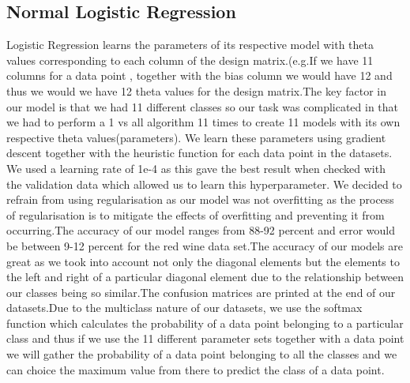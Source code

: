 \documentclass{article}
\begin{document}
\subsection{Normal Logistic Regression}
Logistic Regression learns the parameters of its respective model with theta values corresponding to each column of the design matrix.(e.g.If we have 11 columns for a data point , together with the bias column we would have 12 and thus we would we have 12 theta values for the design matrix.The key factor in our model is that we had 11 different classes so our task was complicated in that we had to perform a 1 vs all algorithm 11 times to create 11 models with its own respective theta values(parameters). We learn these parameters using gradient descent together with the heuristic function for each data point in the datasets. We used a learning rate of 1e-4 as this gave the best result when checked with the validation data which allowed us to learn this hyperparameter. We decided to refrain from using regularisation as our model was not overfitting as the process of regularisation is to mitigate the effects of overfitting and preventing it from occurring.The accuracy of our model ranges from 88-92 percent and error would be between 9-12 percent for the red wine data set.The accuracy of our models are great as we took into account not only the diagonal elements but the elements to the left and right of a particular diagonal element due to the relationship between our classes being so similar.The confusion matrices are printed at the end of our datasets.Due to the multiclass nature of our datasets, we use the softmax function which calculates the probability of a data point belonging to a particular class and thus if we use the 11 different parameter sets together with a data point we will gather the probability of a data point belonging to all the classes and we can choice the maximum value from there to predict the class of a data point.
\end{document}
